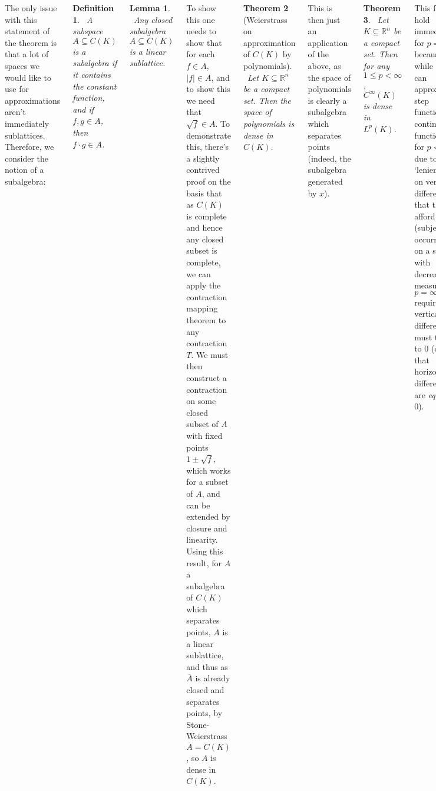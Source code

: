 \documentclass{tikzposter} %
\newtheorem{theorem}{Theorem}
\newtheorem{lemma}[theorem]{Lemma}
\newtheorem{definition}{Definition}
\begin{document}
\begin{columns}
{    The only issue with this statement of the theorem is that a lot of spaces we would like to use for approximations aren't immediately sublattices. Therefore, we consider the notion of a subalgebra:
    \begin{definition}
    \ A subspace $A \subseteq C(K)$ is a subalgebra if it contains the constant function, and if $f, g \in A$, then $f \cdot g \in A$.
    \end{definition}
    \hphantom{}

    \begin{lemma}
    \ Any closed subalgebra $A \subseteq C(K)$ is a linear sublattice.
    \end{lemma}
    \hphantom{}

    To show this one needs to show that for each $f \in A$, $|f| \in A$, and to show this we need that $\sqrt{f} \in A$. To demonstrate this, there's a slightly contrived proof on the basis that as $C(K)$ is complete and hence any closed subset is complete, we can apply the contraction mapping theorem to any contraction $T$. We must then construct a contraction on some closed subset of $A$ with fixed points $1\pm\sqrt{f}$, which works for a subset of $A$, and can be extended by closure and linearity. \\

    Using this result, for $A$ a subalgebra of $C(K)$ which separates points, $\overline{A}$ is a linear sublattice, and thus as $\overline{A}$ is already closed and separates points, by Stone-Weierstrass $\overline{A} = C(K)$, so $A$ is dense in $C(K)$. \\

    \begin{theorem}[Weierstrass on approximation of $C(K)$ by polynomials]
    \ Let $K \subseteq \mathbb{R}^{n}$ be a compact set. Then the space of polynomials is dense in $C(K)$.
    \end{theorem}
    \hphantom{}

    This is then just an application of the above, as the space of polynomials is clearly a subalgebra which separates points (indeed, the subalgebra generated by $x$). \\

    \begin{theorem}
    \ Let $K \subseteq \mathbb{R}^{n}$ be a compact set. Then for any $1 \le p < \infty$, $C^{\infty}(K)$ is dense in $L^{p}(K)$.
    \end{theorem}
    \hphantom{}

    This fails to hold immediately for $p = \infty$, because while we can approximate step functions by continuous functions for $p < \infty$ due to some `leniency' on vertical differences that these afford (subject to occurring on a set with decreasing measure), $p = \infty$ requires vertical differences must tend to $0$ (or that horizontal differences are \emph{equal} to $0$).
  }
\end{columns}
\end{document}
